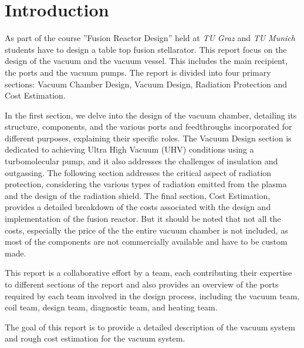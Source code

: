 \section*{Introduction}

As part of the course ''Fusion Reactor Design'' held at \emph{TU Graz} and \emph{TU Munich}
students have to design a table top fusion stellarator.
This report focus on the design of the vacuum and the vacuum vessel.
This includes the main recipient, the ports and the vacuum pumps.
The report is divided into four primary sections: Vacuum Chamber Design, Vacuum Design, Radiation Protection and Cost Estimation.

In the first section, we delve into the design of the vacuum chamber, detailing its structure, components, and the various ports and feedthroughs incorporated for different purposes, explaining their specific roles.
The Vacuum Design section is dedicated to achieving Ultra High Vacuum (UHV) conditions using a turbomolecular pump, and it also addresses the challenges of insulation and outgassing.
The following section addresses the critical aspect of radiation protection, considering the various types of radiation emitted from the plasma and the design of the radiation shield.
The final section, Cost Estimation, provides a detailed breakdown of the costs associated with the design and implementation of the fusion reactor.
But it should be noted that not all the costs, especially the price of the the entire vacuum chamber is not included, as most of the components are not commercially available and have to be custom made.

This report is a collaborative effort by a team, each contributing their expertise to different sections of the report and also provides an overview of the ports required by each team involved in the design process, including the vacuum team, coil team, design team, diagnostic team, and heating team.

The goal of this report is to provide a detailed description of the vacuum system and rough cost estimation for the vacuum system.

